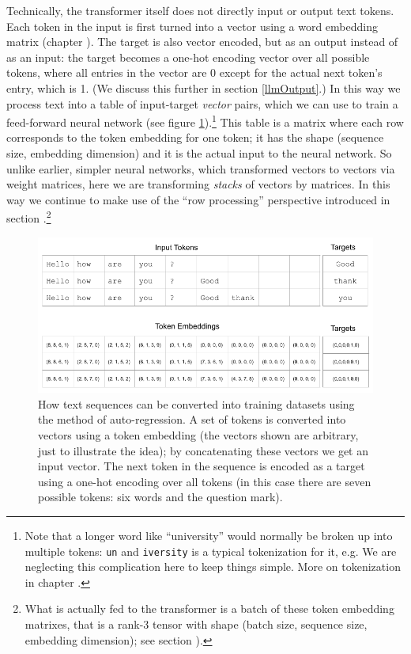 Technically, the transformer itself does not directly input or output text
tokens. Each token in the input is first turned into a vector using a word
embedding matrix (chapter ). The target is also
vector encoded, but as an output instead of as an input: the target becomes a
one-hot encoding vector over all possible tokens, where all entries in the
vector are 0 except for the actual next token's entry, which is 1. (We discuss
this further in section \ref{llmOutput}.) In this way we process text into a
table of input-target \emph{vector} pairs, which we can use to train a
feed-forward neural network (see figure
\ref{nextWordPrediction}).\footnote{Note that a longer word like ``university''
would normally be broken up into multiple tokens: \texttt{un} and
\texttt{iversity} is a typical tokenization for it, e.g. We are neglecting this
complication here to keep things simple. More on tokenization in chapter
.} This table is a matrix where each row corresponds
to the token embedding for one token; it has the shape (sequence size,
embedding dimension) and it is the actual input to the neural network. So
unlike earlier, simpler neural networks, which transformed vectors to vectors
via weight matrices, here we are transforming \emph{stacks} of vectors by
matrices. In this way we continue to make use of the ``row processing'' perspective introduced in section .\footnote{What is actually fed to the transformer is a batch of these
token embedding matrixes, that is a rank-3 tensor with shape (batch size,
sequence size, embedding dimension); see section ).}

\begin{figure}[ht]
\centering
\includegraphics[scale=.45]{./images/contextWindow.png}
\caption[Jeff Yoshimi]{How text sequences can be converted into training
datasets using the method of auto-regression. A set of tokens is converted into
vectors using a token embedding (the vectors shown are arbitrary, just to
illustrate the idea); by concatenating these vectors we get an input vector.
The next token in the sequence is encoded as a target using a one-hot encoding
over all tokens (in this case there are seven possible tokens: six words and
the question mark).}
\label{nextWordPrediction}
\end{figure}

